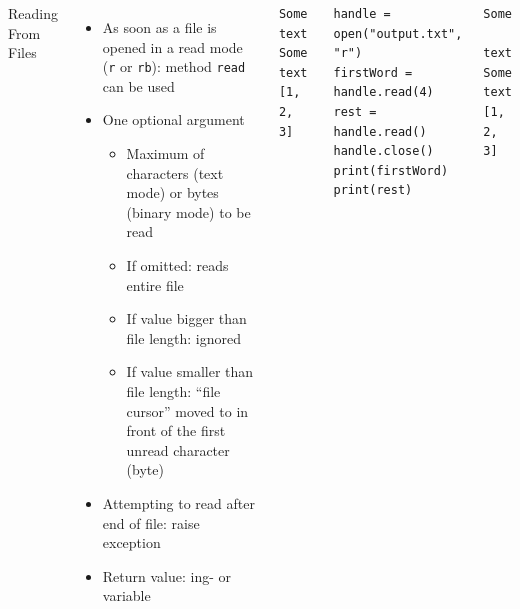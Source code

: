 \begin{frame}[fragile]
%
\begin{columns}[T]
\begin{Large}
	{Reading From Files}
	\vspace{6pt}
\end{Large}
\begin{itemize}
\item As soon as a file is opened in a read mode (\texttt{r} or \texttt{rb}): method \texttt{read} can be used
\item One optional argument
	\begin{itemize}
	\item Maximum of characters (text mode) or bytes (binary mode) to be read
	\item If omitted: reads entire file
	\item If value bigger than file length: ignored
	\item If value smaller than file length: \enquote{file cursor} moved to in front of the first unread character (byte)
	\end{itemize}
\item Attempting to read after end of file: raise exception
\item Return value: ing- or  variable
\end{itemize}
%
\begin{cmdbox}
\begin{verbatim}
Some text Some text
[1, 2, 3]
\end{verbatim}
\end{cmdbox}
%
\begin{codebox}
\begin{verbatim}
handle = open("output.txt", "r")
firstWord = handle.read(4)
rest = handle.read()
handle.close()
print(firstWord)
print(rest)
\end{verbatim}
\end{codebox}
%
\begin{cmdbox}
\begin{verbatim}
Some
 text Some text
[1, 2, 3]
\end{verbatim}
\end{cmdbox}
%
\end{columns}
%
\end{frame}


